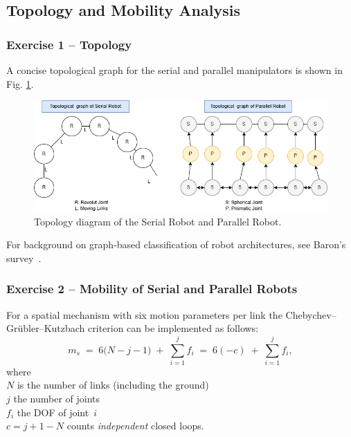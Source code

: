 \documentclass[12pt,a4paper]{article}
\begin{document}
\subsection{Topology and Mobility Analysis}
\subsubsection*{Exercise 1 -- Topology}
A concise topological graph for the serial and parallel manipulators is shown
in Fig. \ref{fig:serial-graph}.  

\begin{figure}[htbp]
  \centering
  \includegraphics[width=0.9\linewidth]{../figs/topology.png}
  \caption{Topology diagram of the Serial Robot and Parallel Robot.}
  \label{fig:serial-graph}
\end{figure}



For background on graph‐based classification of
robot architectures, see Baron’s survey~\cite{Baron2008}.

\subsubsection*{Exercise 2 -- Mobility of Serial and Parallel Robots}

For a spatial mechanism with six motion parameters per link the Chebychev–Grübler–Kutzbach criterion can be implemented as follows:
\begin{equation}
m_s \;=\; 6\bigl(N - j - 1\bigr) \;+\; \sum_{i=1}^{j} f_i
       \;=\; 6(-c) \;+\; \sum_{i=1}^{j} f_i ,
\end{equation}
where \\ \(N\) is the number of links (including the ground) \\ 
\(j\) the number of joints\\ \(f_i\) the DOF of joint~\(i\) \\  
\(c = j + 1 - N\) counts \emph{independent} closed loops.
\end{document}

